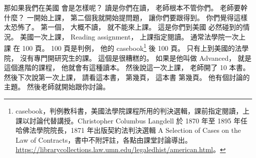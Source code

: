 \hypertarget{w01:cue:2883}{}那如果我們在美國
\hypertarget{w01:cue:2884}{}會是怎樣呢？
\hypertarget{w01:cue:2885}{}讀是你們在讀，
\hypertarget{w01:cue:2886}{}老師根本不管你們。
\hypertarget{w01:cue:2887}{}老師要幹什麼？
\hypertarget{w01:cue:2888}{}一開始上課，
\hypertarget{w01:cue:2889}{}第二個我就開始提問題，
\hypertarget{w01:cue:2890}{}讓你們要跟得到。
\hypertarget{w01:cue:2891}{}你們覺得這樣太恐怖了。
\hypertarget{w01:cue:2892}{}第一個，
\hypertarget{w01:cue:2893}{}大概不讀，
\hypertarget{w01:cue:2894}{}就不能來上課。
\hypertarget{w01:cue:2895}{}這是你們到美國
\hypertarget{w01:cue:2896}{}必然碰到的情況。
\hypertarget{w01:cue:2897}{}美國一次上課，
\hypertarget{w01:cue:2898}{}Reading assignment，
\hypertarget{w01:cue:2899}{}上課指定閱讀。
\hypertarget{w01:cue:2900}{}通常法學院一次上課
\hypertarget{w01:cue:2901}{}在 100 頁。
\hypertarget{w01:cue:2902}{}100 頁是判例，
\hypertarget{w01:cue:2903}{}他的 casebook\footnote{casebook，判例教科書，美國法學院課程所用的判決選輯，課前指定閱讀，上課以討論代替講授。Christopher Columbus Langdell 於 1870 年至 1895 年任哈佛法學院院長，1871 年出版契約法判決選輯 A Selection of Cases on the Law of Contracts，書中不附評註，各點由課堂討論導出。\url{https://librarycollections.law.umn.edu/legaledhist/american.html}。} 後
\hypertarget{w01:cue:2904}{}100 頁。
\hypertarget{w01:cue:2905}{}只有上到美國的法學院，
\hypertarget{w01:cue:2906}{}沒有專門開研究生的課。
\hypertarget{w01:cue:2907}{}這個是很糟糕的。
\hypertarget{w01:cue:2908}{}如果是他叫做 Advanced，
\hypertarget{w01:cue:2909}{}就是這個進階的課程，
\hypertarget{w01:cue:2910}{}他就會有這種讀本。
\hypertarget{w01:cue:2911}{}然後說這一次上課，
\hypertarget{w01:cue:2912}{}老師開了 10 本書。
\hypertarget{w01:cue:2913}{}然後下次說第一次上課，
\hypertarget{w01:cue:2914}{}請看這本書，
\hypertarget{w01:cue:2915}{}第幾頁，
\hypertarget{w01:cue:2916}{}這本書
\hypertarget{w01:cue:2917}{}第幾頁。
\hypertarget{w01:cue:2918}{}他有個討論的主題。
\hypertarget{w01:cue:2919}{}然後老師就開始跟你討論。

